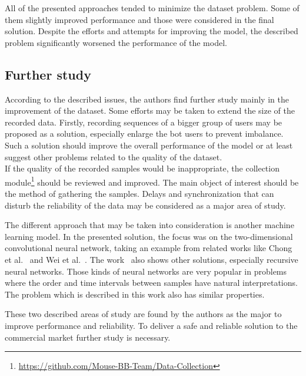 All of the presented approaches tended to minimize the dataset problem.
Some of them slightly improved performance and those were considered in the final solution.
Despite the efforts and attempts for improving the model, the described problem significantly worsened the performance of the model.

\subsection{Further study}\label{subsec:further-study}
According to the described issues, the authors find further study mainly in the improvement of the dataset.
Some efforts may be taken to extend the size of the recorded data.
Firstly, recording sequences of a bigger group of users may be proposed as a solution, especially enlarge the bot users to prevent imbalance.
Such a solution should improve the overall performance of the model or at least suggest other problems related to the quality of the dataset.\\
If the quality of the recorded samples would be inappropriate, the collection module\footnote{\url{https://github.com/Mouse-BB-Team/Data-Collection}} should be reviewed and improved.
The main object of interest should be the method of gathering the samples.
Delays and synchronization that can disturb the reliability of the data may be considered as a major area of study.

The different approach that may be taken into consideration is another machine learning model.
In the presented solution, the focus was on the two-dimensional convolutional neural network, taking an example from related works like Chong et al.~\cite{Main} and Wei et al.~\cite{Inspiration}.
The work~\cite{Main} also shows other solutions, especially recursive neural networks.
Those kinds of neural networks are very popular in problems where the order and time intervals between samples have natural interpretations.
The problem which is described in this work also has similar properties.

These two described areas of study are found by the authors as the major to improve performance and reliability.
To deliver a safe and reliable solution to the commercial market further study is necessary.

